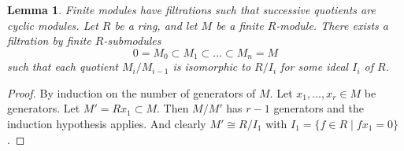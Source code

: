 \documentclass[10pt,a4paper]{amsart}
\newenvironment{slogan}{\comment}{\endcomment}
\theoremstyle{plain}
\newtheorem{lemma}[subsection]{Lemma}
\theoremstyle{definition}
\theoremstyle{remark}
\numberwithin{equation}{subsection}
\begin{document}
\begin{lemma}
\label{lemma-trivial-filter-finite-module}
\begin{slogan}
Finite modules have filtrations such that successive quotients are
cyclic modules.
\end{slogan}
Let $R$ be a ring, and let $M$ be a finite $R$-module.
There exists a filtration by finite $R$-submodules
$$
0 = M_0 \subset M_1 \subset \ldots \subset M_n = M
$$
such that each quotient $M_i/M_{i - 1}$ is isomorphic
to $R/I_i$ for some ideal $I_i$ of $R$.
\end{lemma}

\begin{proof}
By induction on the number of generators of $M$. Let
$x_1, \ldots, x_r \in M$ be generators.
Let $M' = Rx_1 \subset M$. Then $M/M'$ has $r - 1$ generators
and the induction hypothesis applies. And clearly $M' \cong R/I_1$
with $I_1 = \{f \in R \mid fx_1 = 0\}$.
\end{proof}
\end{document}
